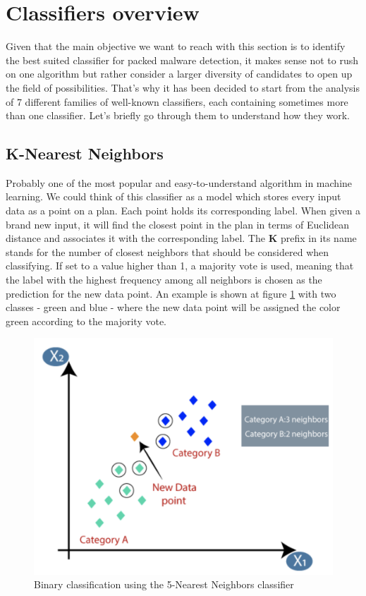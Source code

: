 \section{Classifiers overview} \label{classifiers}

Given that the main objective we want to reach with this section is to identify the best suited classifier for packed malware detection, it makes sense not to rush on one algorithm but rather consider a larger diversity of candidates to open up the field of possibilities. That's why it has been decided to start from the analysis of 7 different families of well-known classifiers, each containing sometimes more than one classifier. Let's briefly go through them to understand how they work.

\subsection{K-Nearest Neighbors} \label{KNN}

Probably one of the most popular and easy-to-understand algorithm in machine learning. We could think of this classifier as a model which stores every input data as a point on a plan. Each point holds its corresponding label. When given a brand new input, it will find the closest point in the plan in terms of Euclidean distance and associates it with the corresponding label. The \textbf{K} prefix in its name stands for the number of closest neighbors that should be considered when classifying. If set to a value higher than 1, a majority vote is used, meaning that the label with the highest frequency among all neighbors is chosen as the prediction for the new data point. An example is shown at figure \ref{fig:KNN} with two classes - green and blue - where the new data point will be assigned the color green according to the majority vote.

\begin{figure}[!ht]
\centering
  \includegraphics[width=0.80\linewidth]{Figures/KNN.png}
  \caption{Binary classification using the 5-Nearest Neighbors classifier \cite{java_knn}}
  \label{fig:KNN}
\end{figure}


